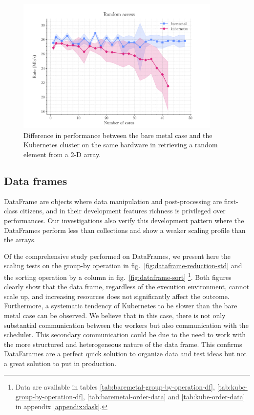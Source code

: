 \begin{figure}
  \centering
  \includegraphics[width=0.9\textwidth]{img/chpt4/array-random-access}
  \caption{Difference in performance between the bare metal case and the
    Kubernetes cluster on the same hardware in retrieving a random element from
    a 2-D array.}
  \label{fig:array-random-access}
\end{figure}

\subsection{Data frames}

DataFrame are objects where data manipulation and post-processing are
first-class citizens, and in their development features richness is privileged
over performances.
Our investigations also verify this development pattern where the DataFrames
perform less than collections and show a weaker scaling profile than the arrays.

Of the comprehensive study performed on DataFrames, we present here the scaling
tests on the group-by operation in fig.~\ref{fig:dataframe-reduction-std} and
the sorting operation by a column in fig.~\ref{fig:dataframe-sort}
\footnote{
  Data are available in tables \ref{tab:baremetal-group-by-operation-df},
  \ref{tab:kube-group-by-operation-df}, \ref{tab:baremetal-order-data} and
  \ref{tab:kube-order-data} in appendix \ref{appendix:dask}.}.
Both figures clearly show that the data frame, regardless
of the execution environment, cannot scale up, and increasing resources does not
significantly affect the outcome.
Furthermore, a systematic tendency of Kubernetes to be slower than the bare
metal case can be observed.
We believe that in this case, there is not only substantial communication
between the workers but also communication with the scheduler.
This secondary communication could be due to the need to work with the more
structured and heterogeneous nature of the data frame.
This confirms DataFarames are a perfect quick solution to organize data and test
ideas but not a great solution to put in production.

